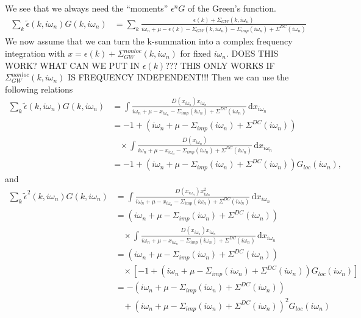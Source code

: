 \documentclass[12pt,a4paper]{scrartcl}
\numberwithin{equation}{section}
\newcommand{\cng}[1]{{\color{red}#1}}
\begin{document}
We see that we always need the ``moments'' $\epsilon^n G$ of the Green's function.
\begin{align}
 \sum_{k} \tilde{ \epsilon}(k,i\omega_n)  G(k,i\omega_n)
 &= \sum_k \frac{\epsilon(k) +\Sigma_{GW}(k,i\omega_n)}
                {i\omega_n + \mu - \epsilon(k) - \Sigma_{GW}(k,i\omega_n)
                        -\Sigma_{imp}(i\omega_n) + \Sigma^{DC}(i\omega_n)}
\end{align}
We now assume that we can turn the 
k-summation into a complex frequency integration
with $x=\epsilon(k) +\Sigma_{GW}^{nonloc}(k,i\omega_n)$ for fixed $i\omega_n$.
\cng{DOES THIS WORK? WHAT CAN WE PUT IN $\epsilon(k)$??? THIS ONLY WORKS 
IF $\Sigma_{GW}^{nonloc}(k,i\omega_n)$ IS FREQUENCY INDEPENDENT!!!}
Then we can use the following relations
\begin{align}
 \sum_{k} \tilde{ \epsilon}(k,i\omega_n)  G(k,i\omega_n)
&= \int \frac{ D(x_{i\omega_n}) x_{i\omega_n} } {i\omega_n + \mu - x_{i\omega_n}
               -\Sigma_{imp}(i\omega_n) + \Sigma^{DC}(i\omega_n)} \, \mathrm{d}x_{i\omega_n} \\
&= -1 + \left(i\omega_n + \mu -\Sigma_{imp}(i\omega_n) + \Sigma^{DC}(i\omega_n)\right) \nonumber\\
 & \ \ \ \ \times \int \frac{ D(x_{i\omega_n}) } {i\omega_n + \mu - x_{i\omega_n}
       -\Sigma_{imp}(i\omega_n) + \Sigma^{DC}(i\omega_n)} \, \mathrm{d}x_{i\omega_n} \\
%
&= -1 + \left(i\omega_n + \mu -\Sigma_{imp}(i\omega_n) + \Sigma^{DC}(i\omega_n)\right) 
         G_{loc}(i\omega_n),
\end{align}
and 
\begin{align}
 \sum_{k} \tilde{ \epsilon}^2(k,i\omega_n)  G(k,i\omega_n)
&= \int \frac{ D(x_{i\omega_n}) x^2_{i\omega_n} } {i\omega_n + \mu - x_{i\omega_n}
               -\Sigma_{imp}(i\omega_n) + \Sigma^{DC}(i\omega_n)} \, \mathrm{d}x_{i\omega_n} \\
%
&= \left(i\omega_n + \mu -\Sigma_{imp}(i\omega_n) + \Sigma^{DC}(i\omega_n)\right) \nonumber\\
 & \ \ \ \ \times \int \frac{ D(x_{i\omega_n}) x_{i\omega_n} } {i\omega_n + \mu - x_{i\omega_n}
       -\Sigma_{imp}(i\omega_n) + \Sigma^{DC}(i\omega_n)} \, \mathrm{d}x_{i\omega_n} \\
%
&= \left(i\omega_n + \mu -\Sigma_{imp}(i\omega_n) + \Sigma^{DC}(i\omega_n)\right) \nonumber\\
 & \ \ \ \ \times \left[ -1 + \left(i\omega_n + \mu -\Sigma_{imp}(i\omega_n) + \Sigma^{DC}(i\omega_n)\right) 
          G_{loc}(i\omega_n) \right] \\
%
&= -\left(i\omega_n + \mu -\Sigma_{imp}(i\omega_n) + \Sigma^{DC}(i\omega_n)\right) \nonumber\\
 & \ \ \ \ + \left(i\omega_n + \mu -\Sigma_{imp}(i\omega_n) + \Sigma^{DC}(i\omega_n)\right)^2 
          G_{loc}(i\omega_n) 
\end{align}
\end{document}
